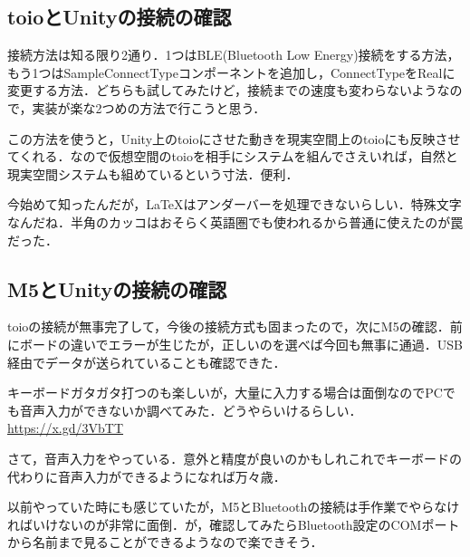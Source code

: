 \documentclass[twocolumn]{mynote}
\begin{document}
\subsection*{toioとUnityの接続の確認}
接続方法は知る限り2通り．1つはBLE(Bluetooth Low Energy)接続をする方法，もう1つはSampleConnectTypeコンポーネントを追加し，ConnectTypeをRealに変更する方法．どちらも試してみたけど，接続までの速度も変わらないようなので，実装が楽な2つめの方法で行こうと思う．

この方法を使うと，Unity上のtoioにさせた動きを現実空間上のtoioにも反映させてくれる．なので仮想空間のtoioを相手にシステムを組んでさえいれば，自然と現実空間システムも組めているという寸法．便利．

今始めて知ったんだが，\LaTeX はアンダーバーを処理できないらしい．特殊文字なんだね．半角のカッコはおそらく英語圏でも使われるから普通に使えたのが罠だった．

\subsection*{M5とUnityの接続の確認}
toioの接続が無事完了して，今後の接続方式も固まったので，次にM5の確認．前にボードの違いでエラーが生じたが，正しいのを選べば今回も無事に通過．USB経由でデータが送られていることも確認できた．

キーボードガタガタ打つのも楽しいが，大量に入力する場合は面倒なのでPCでも音声入力ができないか調べてみた．どうやらいけるらしい．\\
\url{https://x.gd/3VbTT}

さて，音声入力をやっている．意外と精度が良いのかもしれこれでキーボードの代わりに音声入力ができるようになれば万々歳．

以前やっていた時にも感じていたが，M5とBluetoothの接続は手作業でやらなければいけないのが非常に面倒．が，確認してみたらBluetooth設定のCOMポートから名前まで見ることができるようなので楽できそう．
\end{document}
